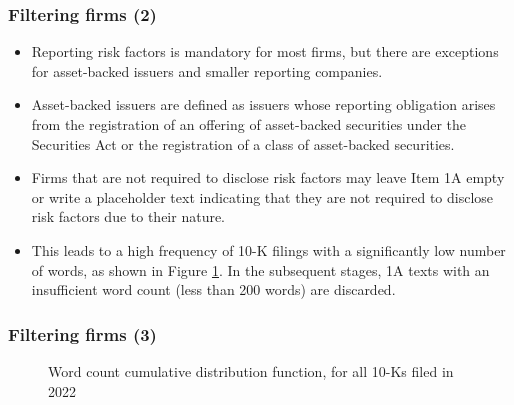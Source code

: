 \documentclass{beamer}
\begin{document}
\begin{frame}
\frametitle{Filtering firms (2)}
\begin{itemize}
\item Reporting risk factors is mandatory for most firms, but there are exceptions for asset-backed issuers and smaller reporting companies.
\item Asset-backed issuers are defined as issuers whose reporting obligation arises from the registration of an offering of asset-backed securities under the Securities Act or the registration of a class of asset-backed securities.
\item Firms that are not required to disclose risk factors may leave Item 1A empty or write a placeholder text indicating that they are not required to disclose risk factors due to their nature.
\item This leads to a high frequency of 10-K filings with a significantly low number of words, as shown in Figure \ref{fig:cdf}. In the subsequent stages, 1A texts with an insufficient word count (less than 200 words) are discarded.

\end{itemize}
\end{frame}

\begin{frame}
\frametitle{Filtering firms (3)}
\begin{figure}
  \centering
  \hfill
  \caption{Word count cumulative distribution function, for all 10-Ks filed in 2022}
  \label{fig:cdf}
\end{figure}
\end{frame}
\end{document}
